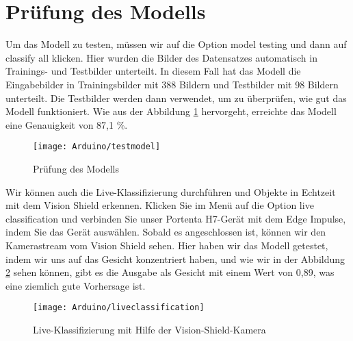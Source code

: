 	\section{Prüfung des Modells}
	
	Um das Modell zu testen, müssen wir auf die Option \glqq model testing\grqq{} und dann auf \glqq classify all\grqq{} klicken. Hier wurden die Bilder des Datensatzes automatisch in Trainings- und Testbilder unterteilt. In diesem Fall hat das Modell die Eingabebilder in Trainingsbilder mit 388 Bildern und Testbilder mit 98 Bildern unterteilt. Die Testbilder werden dann verwendet, um zu überprüfen, wie gut das Modell funktioniert. Wie aus der Abbildung \ref{EdgeImpulseTestingModel} hervorgeht, erreichte das Modell eine Genauigkeit von 87,1 \%.
	
	\begin{figure}[H]
		\centering
		\texttt{[image: Arduino/testmodel]}
		\caption{Prüfung des Modells}
		\label{EdgeImpulseTestingModel}
	\end{figure}
	
	Wir können auch die Live-Klassifizierung durchführen und Objekte in Echtzeit mit dem Vision Shield erkennen.  Klicken Sie im Menü auf die Option \glqq live classification\grqq{}  und verbinden Sie unser Portenta H7-Gerät mit dem Edge Impulse, indem Sie das Gerät auswählen. Sobald es angeschlossen ist, können wir den Kamerastream vom Vision Shield sehen. Hier haben wir das Modell getestet, indem wir uns auf das Gesicht konzentriert haben, und wie wir in der Abbildung \ref{EdgeImpulseLiveClassification} sehen können, gibt es die Ausgabe als Gesicht mit einem Wert von 0,89, was eine ziemlich gute Vorhersage ist.
	
	\begin{figure}[H]
		\centering
		\texttt{[image: Arduino/liveclassification]}
		\caption{Live-Klassifizierung mit Hilfe der Vision-Shield-Kamera}
		\label{EdgeImpulseLiveClassification}
	\end{figure}
	
